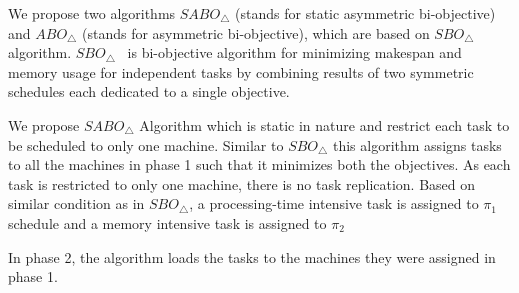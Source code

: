\documentclass[12pt]{article}
\theoremstyle{mystyle}
\begin{document}
     We propose two algorithms $SABO_\triangle$ (stands for static asymmetric bi-objective) and $ABO_\triangle$ (stands for asymmetric bi-objective), which are based on $SBO_\triangle$ algorithm. $SBO_\triangle$~\cite{10.1109/IPDPS.2008.4536292} is bi-objective algorithm for minimizing makespan and memory usage for independent tasks by combining results of two symmetric schedules each dedicated to a single objective.
     
                     
                     We propose $SABO_\triangle$ Algorithm which is static in nature and restrict each task to be scheduled to only one machine. Similar to $SBO_\triangle$ this algorithm assigns tasks to all the machines in phase 1 such that it minimizes both the objectives. As each task is restricted to only one machine, there is no task replication. Based on similar condition as in $SBO_\triangle$, a processing-time intensive task is assigned to $\pi_1$ schedule and a memory intensive task is assigned to $\pi_2$
                     
                     In phase 2, the algorithm loads the tasks to the machines they were assigned in phase 1.\\
                     
\end{document}

